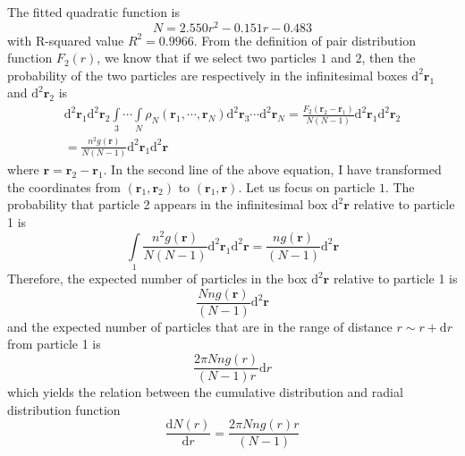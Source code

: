 \documentclass[letterpaper,12pt]{article}
\numberwithin{equation}{section}
\begin{document}
The fitted quadratic function is 
\begin{equation}
    N=2.550r^2-0.151r-0.483
\end{equation}
with R-squared value $R^2=0.9966$. From the definition of pair distribution function $F_2(r)$, we know that if we select two particles $1$ and $2$, then the probability of the two particles are respectively in the infinitesimal boxes $\mathrm{d}^2\boldsymbol{r}_1$ and $\mathrm{d}^2\boldsymbol{r}_2$ is 
\begin{equation}    
\begin{aligned}
    \mathrm{d}^2\boldsymbol{r}_1\mathrm{d}^2\boldsymbol{r}_2\int\limits_3\cdots\int\limits_N\rho_N(\boldsymbol{r}_1,\cdots,\boldsymbol{r}_N)\mathrm{d}^2\boldsymbol{r}_3\cdots\mathrm{d}^2\boldsymbol{r}_N=\frac{F_2(\boldsymbol{r}_2-\boldsymbol{r}_1)}{N(N-1)}\mathrm{d}^2\boldsymbol{r}_1\mathrm{d}^2\boldsymbol{r}_2 \\
    =\frac{n^2g(\boldsymbol{r})}{N(N-1)}\mathrm{d}^2\boldsymbol{r}_1\mathrm{d}^2\boldsymbol{r}
\end{aligned}
\end{equation}
where $\boldsymbol{r}=\boldsymbol{r}_2-\boldsymbol{r}_1$. In the second line of the above equation, I have transformed the coordinates from $(\boldsymbol{r}_1,\boldsymbol{r}_2)$ to $(\boldsymbol{r}_1,\boldsymbol{r})$. Let us focus on particle $1$. The probability that particle 2 appears in the infinitesimal box $\mathrm{d}^2\boldsymbol{r}$ relative to particle 1 is
\begin{equation}
    \int\limits_1{\frac{n^2g(\boldsymbol{r})}{N(N-1)}\mathrm{d}^2\boldsymbol{r}_1\mathrm{d}^2\boldsymbol{r}}=\frac{ng(\boldsymbol{r})}{(N-1)}\mathrm{d}^2\boldsymbol{r}
\end{equation}
Therefore, the expected number of particles in the box $\mathrm{d}^2\boldsymbol{r}$ relative to particle 1 is
\begin{equation}
    \frac{Nng(\boldsymbol{r})}{(N-1)}\mathrm{d}^2\boldsymbol{r}
\end{equation}
and the expected number of particles that are in the range of distance $r\sim r+\mathrm{d}r$ from particle 1 is
\begin{equation}
    \frac{2\pi Nng(r)}{(N-1)r}\mathrm{d}r    
\end{equation}
which yields the relation between the cumulative distribution and radial distribution function
\begin{equation}
    \frac{\mathrm{d}N(r)}{\mathrm{d}r}=\frac{2\pi Nng(r)r}{(N-1)}
\end{equation}
\end{document}
